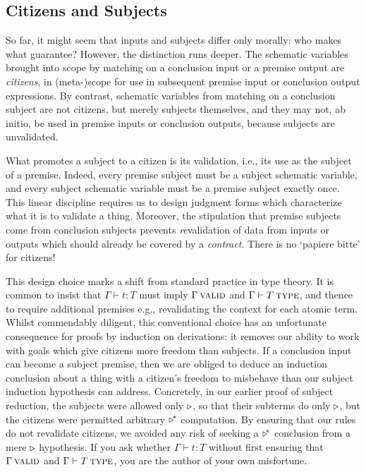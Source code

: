 \documentclass[format=acmsmall, screen, review, anonymous, timestamp]{acmart}
\begin{document}
\subsection{Citizens and Subjects}

So far, it might seem that inputs and subjects differ only morally: who makes what guarantee? However, the distinction runs deeper. The schematic variables brought into scope by matching on a conclusion input or a premise output are \emph{citizens}, in (meta-)scope for use in subsequent premise input or conclusion output expressions. By contrast, schematic variables from matching on a conclusion subject are not citizens, but merely subjects themselves, and they may not, ab initio, be used in premise inputs or conclusion outputs, because subjects are unvalidated.

What promotes a subject to a citizen is its validation, i.e., its use as the subject of a premise. Indeed, every premise subject must be a subject schematic variable, and every subject schematic variable must be a premise subject exactly once. This linear discipline requires us to design judgment forms which characterize what it is to validate a thing. Moreover, the stipulation that premise subjects come from conclusion subjects prevents \emph{re}validation of data from inputs or outputs which should already be covered by a \emph{contract}. There is no `papiere bitte' for citizens!

This design choice marks a shift from standard practice in type theory. It is common to insist that $\Gamma\vdash t:T$ must imply $\Gamma\:\textsc{valid}$ and $\Gamma\vdash T\:\textsc{type}$, and thence to require additional premises e.g., revalidating the context for each atomic term. Whilst commendably diligent, this conventional choice has an unfortunate consequence for proofs by induction on derivations: it removes our ability to work with goals which give citizens more freedom than subjects. If a conclusion input can become a subject premise, then we are obliged to deduce an induction conclusion about a thing with a citizen's freedom to misbehave than our subject induction hypothesis can address. Concretely, in our earlier proof of subject reduction, the subjects were allowed only $\triangleright$, so that their subterms do only $\triangleright$, but the citizens were permitted arbitrary $\triangleright^{\!\ast}$ computation. By ensuring that our rules do not revalidate citizens, we avoided any risk of seeking a $\triangleright^{\!\ast}$ conclusion from a mere $\triangleright$ hypothesis. If you ask whether $\Gamma\vdash t:T$ without first ensuring that $\Gamma\:\textsc{valid}$ and $\Gamma\vdash T\:\textsc{type}$, you are the author of your own misfortune.
\end{document}
